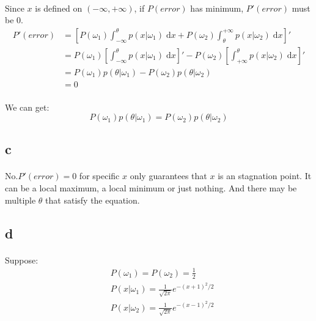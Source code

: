 \documentclass[]{article}
\begin{document}
            \paragraph{} Since $x$ is defined on $(-\infty,+\infty)$, if $P(error)$ has minimum, $P'(error)$ must be 0.
                \begin{align*}
                    P'(error) &= [P(\omega_1)\int_{-\infty}^{\theta} p(x|\omega_1)  \; \mathrm{d}x 
                              + P(\omega_2)\int_{\theta}^{+\infty} p(x|\omega_2)  \; \mathrm{d}x]' \\                              
                              &= P(\omega_1)[\int_{-\infty}^{\theta} p(x|\omega_1)  \; \mathrm{d}x ]'
                              - P(\omega_2)[\int_{+\infty}^{\theta} p(x|\omega_2)  \; \mathrm{d}x]' \\                              
                              &= P(\omega_1) p(\theta|\omega_1)
                              - P(\omega_2) p(\theta|\omega_2) \\
                              &= 0
                \end{align*}
            \paragraph{} We can get:
                \begin{equation*}
                    P(\omega_1) p(\theta|\omega_1)
                              = P(\omega_2) p(\theta|\omega_2)
                \end{equation*}
        \subsection{c}
            \paragraph{} No.$P'(error)=0$ for specific $x$ only guarantees that $x$ is an stagnation point. It can be a local maximum, a local minimum or just nothing. And there may be multiple $\theta$ that satisfy the equation.
        \subsection{d}
            \paragraph{}Suppose:
            \begin{align*}
                &P(\omega_1) = P(\omega_2) = \frac{1}{2} \\
                &P(x|\omega_1) = \frac{1}{\sqrt{2\pi}}e^{-(x+1)^2/2} \\
                &P(x|\omega_2) = \frac{1}{\sqrt{2\pi}}e^{-(x-1)^2/2}
            \end{align*}
\end{document}
